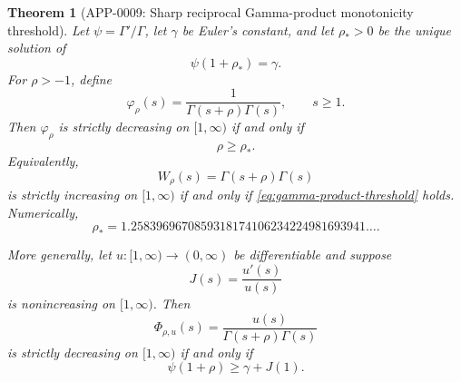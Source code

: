 \documentclass[11pt]{article}
\numberwithin{equation}{section}
\newtheorem{theorem}{Theorem}[section]
\theoremstyle{definition}
\theoremstyle{remark}
\newcommand{\1}{\mathbf 1}
\begin{document}
\begin{theorem}[APP-0009: Sharp reciprocal Gamma-product monotonicity threshold]
\label{thm:gamma-product-sharp-threshold}
Let \(\psi=\Gamma'/\Gamma\), let \(\gamma\) be Euler's constant, and let
\(\rho_*>0\) be the unique solution of
\begin{equation}
\label{eq:gamma-product-rho-star}
\psi(1+\rho_*)=\gamma.
\end{equation}
For \(\rho>-1\), define
\begin{equation}
\label{eq:gamma-product-reciprocal}
\varphi_\rho(s)=\frac{1}{\Gamma(s+\rho)\Gamma(s)},\qquad s\ge1.
\end{equation}
Then \(\varphi_\rho\) is strictly decreasing on \([1,\infty)\) if and only if
\begin{equation}
\label{eq:gamma-product-threshold}
\rho\ge\rho_*.
\end{equation}
Equivalently,
\begin{equation}
\label{eq:gamma-product-W}
W_\rho(s)=\Gamma(s+\rho)\Gamma(s)
\end{equation}
is strictly increasing on \([1,\infty)\) if and only if
\eqref{eq:gamma-product-threshold} holds.  Numerically,
\begin{equation}
\label{eq:gamma-product-rho-star-numeric}
\rho_*=1.2583969670859318174106234224981693941\ldots .
\end{equation}

More generally, let \(u:[1,\infty)\to(0,\infty)\) be differentiable and suppose
\begin{equation}
\label{eq:gamma-product-J}
J(s)=\frac{u'(s)}{u(s)}
\end{equation}
is nonincreasing on \([1,\infty)\).  Then
\begin{equation}
\label{eq:gamma-product-general-Phi}
\Phi_{\rho,u}(s)=\frac{u(s)}{\Gamma(s+\rho)\Gamma(s)}
\end{equation}
is strictly decreasing on \([1,\infty)\) if and only if
\begin{equation}
\label{eq:gamma-product-general-threshold}
\psi(1+\rho)\ge\gamma+J(1).
\end{equation}
\end{theorem}
\end{document}
